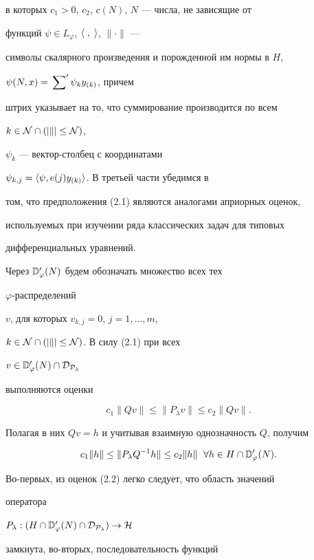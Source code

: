 в которых $c_1>0$, $c_2$, $c(N)$, $N$ --- числа, не зависящие от 


функций $\psi\in L_\varphi$, $\langle\;,\;\rangle$, $\|\cdot\|$ --- 


символы скалярного произведения и порожденной им нормы в $H$, 


$\psi(N,x)=\sideset{}{'}\sum\psi_k y_{(k)}$, причем 


штрих указывает на то, что суммирование производится по всем 


$k\in\cal N\cap(|k|\le N)$, 


$\psi_k$ --- вектор-столбец с координатами 


$\psi_{k,j}=\langle\psi,e(j)y_{(k)}\rangle$. В третьей части убедимся в 


том, что предположения (2.1) являются аналогами априорных оценок, 


используемых при изучении ряда классических задач для типовых 


дифференциальных уравнений. 


 


Через $\Bbb D'_\varphi(N)$ будем обозначать множество всех тех 


$\varphi$-распределений 


$v$, для которых $v_{k,j}=0$, $j=1,\dotsc,m$, 


$k\in\cal N\cap(|k|\le N)$. В силу (2.1) при всех 


$v\in\Bbb D'_\varphi(N)\cap\cal D_{P_\lambda}$ 


выполняются оценки 


$$ 


c_1\|Q v\|\le\|P_\lambda v\|\le c_2\|Q v\|. 


$$ 


Полагая в них $Q v=h$ и учитывая взаимную однозначность $Q$, получим 


\begin{equation} 


c_1\|h\|\le\|P_\lambda Q^{-1}h\|\le c_2\|h\| 


\ \;\forall h\in H\cap\Bbb D'_\varphi(N). 


\end{equation} 


Во-первых, из оценок (2.2) легко следует, что область значений 


оператора 


$P_\lambda:(H\cap\Bbb D'_\varphi(N)\cap\cal D_{P_\lambda})\to H$ 


замкнута, во-вторых, последовательность функций 


